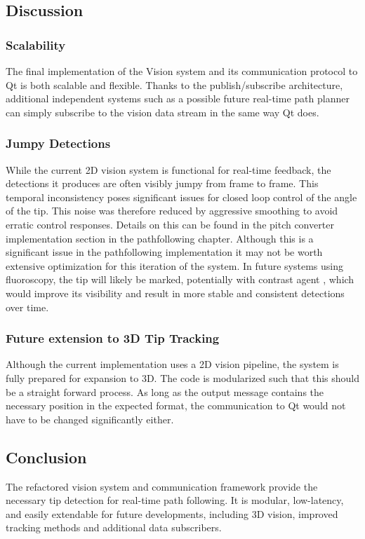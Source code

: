 \subsection{Discussion}
\subsubsection{Scalability}
The final implementation of the Vision system and its communication protocol to Qt is both scalable and flexible. Thanks to the publish/subscribe architecture, additional independent systems such as a possible future real-time path planner can simply subscribe to the vision data stream in the same way Qt does.

\subsubsection{Jumpy Detections}
While the current 2D vision system is functional for real-time feedback, the detections it produces are often visibly jumpy from frame to frame. This temporal inconsistency poses significant issues for closed loop control of the angle of the tip. This noise was therefore reduced by aggressive smoothing to avoid erratic control responses. Details on this can be found in the pitch converter implementation section in the pathfollowing chapter. 
\newline \newline 
Although this is a significant issue in the pathfollowing implementation it may not be worth extensive optimization for this iteration of the system. In future systems using fluoroscopy, the tip will likely be marked, potentially with contrast agent , which would improve its visibility and result in more stable and consistent detections over time.

\subsubsection{Future extension to 3D Tip Tracking}
Although the current implementation uses a 2D vision pipeline, the system is fully prepared for expansion to 3D. The code is modularized such that this should be a straight forward process. As long as the output message contains the necessary position in the expected format, the communication to Qt would not have to be changed significantly either.

\subsection{Conclusion}
The refactored vision system and communication framework provide the necessary tip detection for real-time path following. It is modular, low-latency, and easily extendable for future developments, including 3D vision, improved tracking methods and additional data subscribers.

